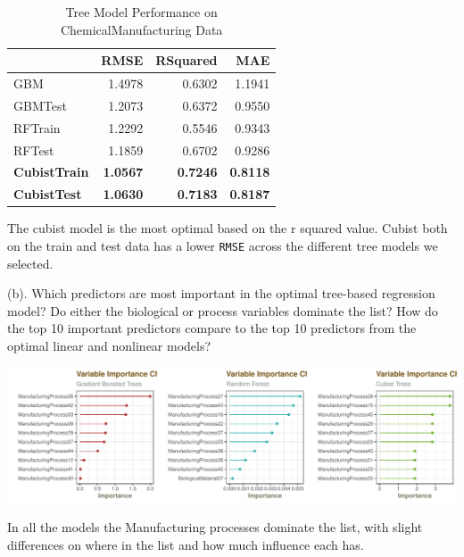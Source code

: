 \documentclass[]{report}
\begin{document}
\begin{table}[H]

\caption{\label{tab:unnamed-chunk-1}Tree Model Performance on ChemicalManufacturing Data}
\centering
\fontsize{8}{10}\selectfont
\begin{tabular}[t]{l|r|r|r}
\hline
\textbf{ } & \textbf{RMSE} & \textbf{RSquared} & \textbf{MAE}\\
\hline
\rowcolor{gray!6}  GBM & 1.4978 & 0.6302 & 1.1941\\
\hline
GBMTest & 1.2073 & 0.6372 & 0.9550\\
\hline
\rowcolor{gray!6}  RFTrain & 1.2292 & 0.5546 & 0.9343\\
\hline
RFTest & 1.1859 & 0.6702 & 0.9286\\
\hline
\rowcolor{gray!6}  \rowcolor[HTML]{d9f2e6}  \textbf{CubistTrain} & \textbf{1.0567} & \textbf{0.7246} & \textbf{0.8118}\\
\hline
\rowcolor[HTML]{d9f2e6}  \textbf{CubistTest} & \textbf{1.0630} & \textbf{0.7183} & \textbf{0.8187}\\
\hline
\end{tabular}
\end{table}

The cubist model is the most optimal based on the r squared value.
Cubist both on the train and test data has a lower \texttt{RMSE} across
the different tree models we selected.

\begin{subquestion}{(b).} Which predictors are most important in the optimal tree-based regression model? Do either the biological or process variables dominate the list? How do the top 10 important predictors compare to the top 10 predictors from the optimal linear and nonlinear models?\end{subquestion}

\includegraphics{Homework-Two_files/figure-latex/kj-8.7b-1.pdf}

In all the models the Manufacturing processes dominate the list, with
slight differences on where in the list and how much influence each has.
\end{document}
